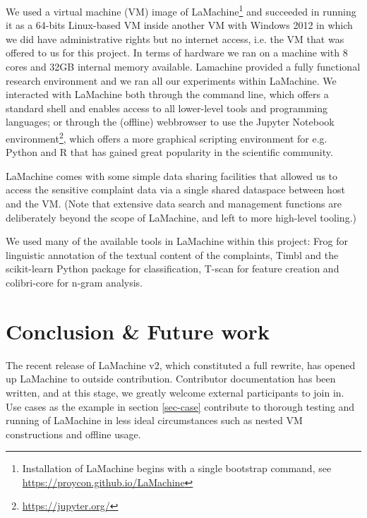 \documentclass[a4paper,11pt]{article}
\begin{document}
We used a virtual machine (VM) image of LaMachine\footnote{Installation of LaMachine begins with a single bootstrap command, see
\url{https://proycon.github.io/LaMachine}} and succeeded in running it as a 64-bits Linux-based VM inside another
VM with Windows 2012 in which we did have administrative rights but no internet access, i.e. the VM that was offered to
us for this project. In terms of hardware we ran on a
machine with 8 cores and  32GB internal memory available.
Lamachine provided a fully functional research environment and we ran all our experiments within LaMachine. We interacted with LaMachine both through the command line, which offers a standard
shell and enables access to all lower-level tools and programming languages; or through the (offline) webbrowser to use the Jupyter Notebook environment\footnote{\url{https://jupyter.org/}}, which offers a more graphical scripting environment
for e.g. Python and R that has gained great popularity in the scientific community.

LaMachine comes with some simple data sharing facilities that allowed us to access the sensitive complaint data via a single shared dataspace between host and the VM. (Note that extensive data search and management functions are deliberately beyond the scope of LaMachine, and left to more high-level tooling.)

We used many of the available tools in LaMachine within this project: Frog for linguistic annotation of the textual content of the complaints, Timbl and the scikit-learn Python package \cite{scikit-learn} for classification, T-scan for feature creation and colibri-core for n-gram analysis.



\section{Conclusion \& Future work}

The recent release of LaMachine v2, which constituted a full rewrite, has opened up LaMachine to outside
contribution. Contributor documentation has been written, and at this stage, we greatly welcome external participants
to join in. Use cases as the example in section \ref{sec-case} contribute to thorough testing and running of LaMachine in less ideal circumstances such as nested VM constructions and offline usage.
\end{document}
